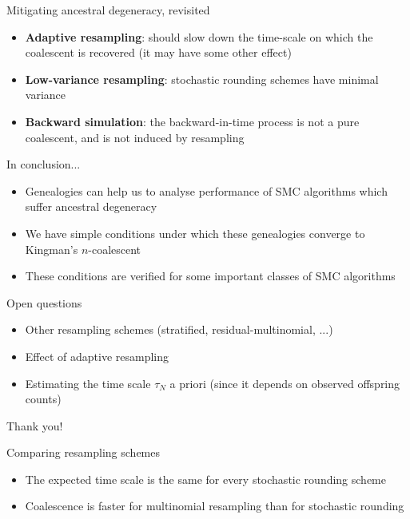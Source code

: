 \documentclass[aspectratio=169]{beamer}
\theoremstyle{definition}
\begin{document}
\begin{frame}{Mitigating ancestral degeneracy, revisited}
\pause
\begin{itemize}[<+->]
\item \textbf{Adaptive resampling}: should slow down the time-scale on which the coalescent is recovered (it may have some other effect)
\item \textbf{Low-variance resampling}: stochastic rounding schemes have minimal variance
\item \textbf{Backward simulation}: the backward-in-time process is not a pure coalescent, and is not induced by resampling
\end{itemize}
\end{frame}


\begin{frame}{In conclusion...}
\begin{itemize}
\item Genealogies can help us to analyse performance of SMC algorithms which suffer ancestral degeneracy
\item We have simple conditions under which these genealogies converge to Kingman's $n$-coalescent
\item These conditions are verified for some important classes of SMC algorithms
\end{itemize}
\end{frame}


\begin{frame}{Open questions}
\begin{itemize}
\item Other resampling schemes (stratified, residual-multinomial, ...)
\item Effect of adaptive resampling
\item Estimating the time scale $\tau_N$ a priori (since it depends on observed offspring counts)
\end{itemize}
\end{frame}


\begin{frame}
\centering
\vspace{1cm}
{\Large Thank you!}
\end{frame}



\begin{frame}{Comparing resampling schemes}
\begin{itemize}
\item The expected time scale is the same for every stochastic rounding scheme
\item Coalescence is faster for multinomial resampling than for stochastic rounding
\end{itemize}
\end{frame}
\end{document}
